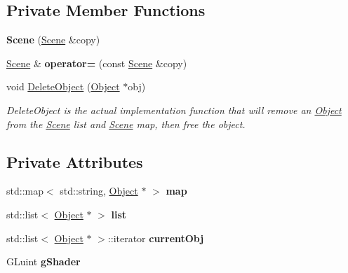 \subsection*{Private Member Functions}
\begin{DoxyCompactItemize}
\item 
\hypertarget{class_scene_a54a7aee3ada3309584dd979bd82c159a}{{\bfseries Scene} (\hyperlink{class_scene}{Scene} \&copy)}\label{class_scene_a54a7aee3ada3309584dd979bd82c159a}

\item 
\hypertarget{class_scene_af43eeff7e8d0d450c68341c73f9b1ab4}{\hyperlink{class_scene}{Scene} \& {\bfseries operator=} (const \hyperlink{class_scene}{Scene} \&copy)}\label{class_scene_af43eeff7e8d0d450c68341c73f9b1ab4}

\item 
void \hyperlink{class_scene_a8bbe0e5b1bfc71034b18e240e86aa285}{Delete\-Object} (\hyperlink{class_object}{Object} $\ast$obj)
\begin{DoxyCompactList}\small\item\em Delete\-Object is the actual implementation function that will remove an \hyperlink{class_object}{Object} from the \hyperlink{class_scene}{Scene} list and \hyperlink{class_scene}{Scene} map, then free the object. \end{DoxyCompactList}\end{DoxyCompactItemize}
\subsection*{Private Attributes}
\begin{DoxyCompactItemize}
\item 
\hypertarget{class_scene_ad4f10706155e3e956fe36a4b5f0ef731}{std\-::map$<$ std\-::string, \hyperlink{class_object}{Object} $\ast$ $>$ {\bfseries map}}\label{class_scene_ad4f10706155e3e956fe36a4b5f0ef731}

\item 
\hypertarget{class_scene_ac04ab16dd305db619afe5f8ec6a02ebc}{std\-::list$<$ \hyperlink{class_object}{Object} $\ast$ $>$ {\bfseries list}}\label{class_scene_ac04ab16dd305db619afe5f8ec6a02ebc}

\item 
\hypertarget{class_scene_acbf527a005c67461e03d343a9f853807}{std\-::list$<$ \hyperlink{class_object}{Object} $\ast$ $>$\-::iterator {\bfseries current\-Obj}}\label{class_scene_acbf527a005c67461e03d343a9f853807}

\item 
\hypertarget{class_scene_aece20244e3987065f05057452a14d81f}{G\-Luint {\bfseries g\-Shader}}\label{class_scene_aece20244e3987065f05057452a14d81f}

\end{DoxyCompactItemize}


